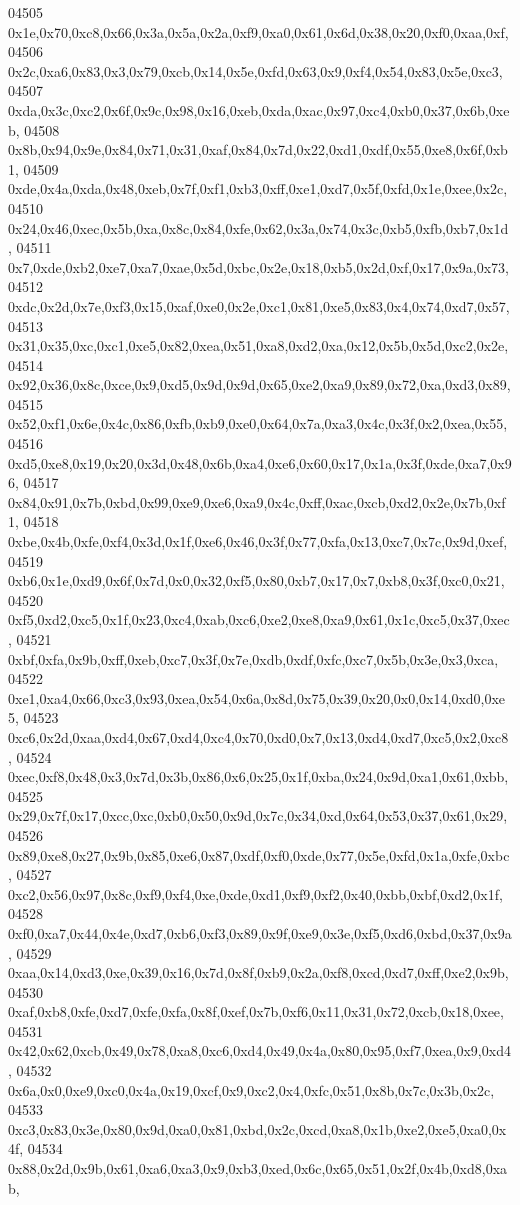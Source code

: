 \begin{DoxyCode}
04505   0x1e,0x70,0xc8,0x66,0x3a,0x5a,0x2a,0xf9,0xa0,0x61,0x6d,0x38,0x20,0xf0,0xaa,0xf,
04506   0x2c,0xa6,0x83,0x3,0x79,0xcb,0x14,0x5e,0xfd,0x63,0x9,0xf4,0x54,0x83,0x5e,0xc3,
04507   0xda,0x3c,0xc2,0x6f,0x9c,0x98,0x16,0xeb,0xda,0xac,0x97,0xc4,0xb0,0x37,0x6b,0xeb,
04508   0x8b,0x94,0x9e,0x84,0x71,0x31,0xaf,0x84,0x7d,0x22,0xd1,0xdf,0x55,0xe8,0x6f,0xb1,
04509   0xde,0x4a,0xda,0x48,0xeb,0x7f,0xf1,0xb3,0xff,0xe1,0xd7,0x5f,0xfd,0x1e,0xee,0x2c,
04510   0x24,0x46,0xec,0x5b,0xa,0x8c,0x84,0xfe,0x62,0x3a,0x74,0x3c,0xb5,0xfb,0xb7,0x1d,
04511   0x7,0xde,0xb2,0xe7,0xa7,0xae,0x5d,0xbc,0x2e,0x18,0xb5,0x2d,0xf,0x17,0x9a,0x73,
04512   0xdc,0x2d,0x7e,0xf3,0x15,0xaf,0xe0,0x2e,0xc1,0x81,0xe5,0x83,0x4,0x74,0xd7,0x57,
04513   0x31,0x35,0xc,0xc1,0xe5,0x82,0xea,0x51,0xa8,0xd2,0xa,0x12,0x5b,0x5d,0xc2,0x2e,
04514   0x92,0x36,0x8c,0xce,0x9,0xd5,0x9d,0x9d,0x65,0xe2,0xa9,0x89,0x72,0xa,0xd3,0x89,
04515   0x52,0xf1,0x6e,0x4c,0x86,0xfb,0xb9,0xe0,0x64,0x7a,0xa3,0x4c,0x3f,0x2,0xea,0x55,
04516   0xd5,0xe8,0x19,0x20,0x3d,0x48,0x6b,0xa4,0xe6,0x60,0x17,0x1a,0x3f,0xde,0xa7,0x96,
04517   0x84,0x91,0x7b,0xbd,0x99,0xe9,0xe6,0xa9,0x4c,0xff,0xac,0xcb,0xd2,0x2e,0x7b,0xf1,
04518   0xbe,0x4b,0xfe,0xf4,0x3d,0x1f,0xe6,0x46,0x3f,0x77,0xfa,0x13,0xc7,0x7c,0x9d,0xef,
04519   0xb6,0x1e,0xd9,0x6f,0x7d,0x0,0x32,0xf5,0x80,0xb7,0x17,0x7,0xb8,0x3f,0xc0,0x21,
04520   0xf5,0xd2,0xc5,0x1f,0x23,0xc4,0xab,0xc6,0xe2,0xe8,0xa9,0x61,0x1c,0xc5,0x37,0xec,
04521   0xbf,0xfa,0x9b,0xff,0xeb,0xc7,0x3f,0x7e,0xdb,0xdf,0xfc,0xc7,0x5b,0x3e,0x3,0xca,
04522   0xe1,0xa4,0x66,0xc3,0x93,0xea,0x54,0x6a,0x8d,0x75,0x39,0x20,0x0,0x14,0xd0,0xe5,
04523   0xc6,0x2d,0xaa,0xd4,0x67,0xd4,0xc4,0x70,0xd0,0x7,0x13,0xd4,0xd7,0xc5,0x2,0xc8,
04524   0xec,0xf8,0x48,0x3,0x7d,0x3b,0x86,0x6,0x25,0x1f,0xba,0x24,0x9d,0xa1,0x61,0xbb,
04525   0x29,0x7f,0x17,0xcc,0xc,0xb0,0x50,0x9d,0x7c,0x34,0xd,0x64,0x53,0x37,0x61,0x29,
04526   0x89,0xe8,0x27,0x9b,0x85,0xe6,0x87,0xdf,0xf0,0xde,0x77,0x5e,0xfd,0x1a,0xfe,0xbc,
04527   0xc2,0x56,0x97,0x8c,0xf9,0xf4,0xe,0xde,0xd1,0xf9,0xf2,0x40,0xbb,0xbf,0xd2,0x1f,
04528   0xf0,0xa7,0x44,0x4e,0xd7,0xb6,0xf3,0x89,0x9f,0xe9,0x3e,0xf5,0xd6,0xbd,0x37,0x9a,
04529   0xaa,0x14,0xd3,0xe,0x39,0x16,0x7d,0x8f,0xb9,0x2a,0xf8,0xcd,0xd7,0xff,0xe2,0x9b,
04530   0xaf,0xb8,0xfe,0xd7,0xfe,0xfa,0x8f,0xef,0x7b,0xf6,0x11,0x31,0x72,0xcb,0x18,0xee,
04531   0x42,0x62,0xcb,0x49,0x78,0xa8,0xc6,0xd4,0x49,0x4a,0x80,0x95,0xf7,0xea,0x9,0xd4,
04532   0x6a,0x0,0xe9,0xc0,0x4a,0x19,0xcf,0x9,0xc2,0x4,0xfc,0x51,0x8b,0x7c,0x3b,0x2c,
04533   0xc3,0x83,0x3e,0x80,0x9d,0xa0,0x81,0xbd,0x2c,0xcd,0xa8,0x1b,0xe2,0xe5,0xa0,0x4f,
04534   0x88,0x2d,0x9b,0x61,0xa6,0xa3,0x9,0xb3,0xed,0x6c,0x65,0x51,0x2f,0x4b,0xd8,0xab,

\end{DoxyCode}
